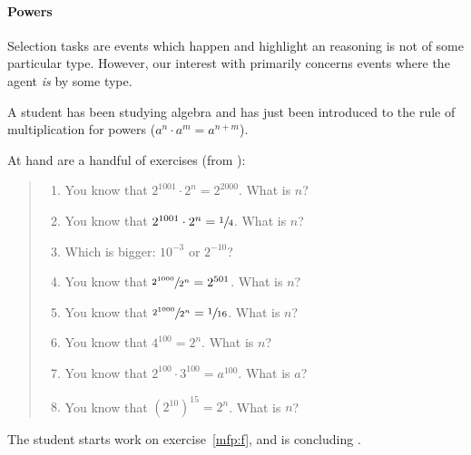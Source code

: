 \paragraph*{Powers}

\begin{note}
  Selection tasks are events which happen and highlight an \agents{} reasoning is not of some particular type.
  However, our interest with \tCN{} primarily concerns events where the agent \emph{is} \tCV{} by some type.
\end{note}

\begin{note}
  \begin{scenario}%
    \label{illu:tR:powers}%
    A student has been studying algebra and has just been introduced to the rule of multiplication for powers (\(a^{n} \cdot a^{m} = a^{n + m}\)).

    At hand are a handful of exercises (from \cite[32]{Gelfand:1993aa}):
    \begin{quote}
      \begin{enumerate}[label=(\alph*), ref=(\alph*)]
      \item
        \label{mfp:a}
        You know that \(2^{1001} \cdot 2^{n} = 2^{2000}\).
        What is \(n\)?
      \item
        \label{mfp:b}
        You know that \(2^{1001} \cdot 2^{n} = \sfrac{1}{4}\).
        What is \(n\)?
      \item
        \label{mfp:c}
        Which is bigger: \(10^{-3}\) or \(2^{-10}\)?
      \item
        \label{mfp:d}
        You know that \(\sfrac{2^{1000}}{2^{n}} = 2^{501}\).
        What is \(n\)?
      \item
        \label{mfp:e}
        You know that \(\sfrac{2^{1000}}{2^{n}} = \sfrac{1}{16}\).
        What is \(n\)?
      \item
        \label{mfp:f}
        You know that \(4^{100} = 2^{n}\).
        What is \(n\)?
      \item
        \label{mfp:g}
        You know that \(2^{100} \cdot 3^{100} = a^{100}\).
        What is \(a\)?
      \item
        \label{mfp:h}
        You know that \((2^{10})^{15} = 2^{n}\).
        What is \(n\)?
      \end{enumerate}
    \end{quote}
    The student starts work on exercise~\ref{mfp:f}, and is concluding .
  \end{scenario}


\end{note}
